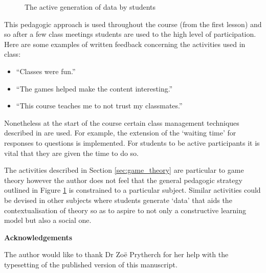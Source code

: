 \documentclass{article}
\begin{document}
\begin{figure}[!hbtp]
    \centering
    
    \caption{The active generation of data by students}
    \label{fig:use_of_data}
\end{figure}

This pedagogic approach is used throughout the course (from the first lesson)
and so after a few class meetings students are used to the high level of
participation. Here are some examples of written feedback concerning the
activities used in class:

\begin{itemize}
    \item ``Classes were fun.''
    \item ``The games helped make the content interesting.''
    \item ``This course teaches me to not trust my classmates.''
\end{itemize}

Nonetheless at the start of the course certain class management techniques
described in \cite{Rocca2010} are used. For example, the extension of the
`waiting time' for responses to questions is implemented. For students to be
active participants it is vital that they are given the time to do so.


The activities described in Section \ref{sec:game_theory} are particular to game
theory however the author does not feel that the general pedagogic strategy
outlined in Figure \ref{fig:use_of_data} is constrained to a particular subject.
Similar activities could be devised in other subjects where students generate
`data' that aids the contextualisation of theory so as to aspire to not only a
constructive learning model but also a social one.

\textbf{Acknowledgements}

The author would like to thank Dr Zo{\"e} Prytherch for her help with the typesetting of the published version of this manuscript.

\printbibliography
\end{document}
